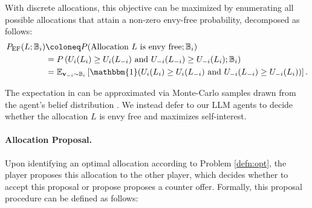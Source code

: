 With discrete allocations, this objective can be maximized by enumerating all possible allocations that attain a non-zero envy-free probability, decomposed as follows:
\begin{align}
\label{eq:envy-free-prob}
P_{\text{EF}}(L; \mathbb{B}_i) &\coloneq P(\text{Allocation } L \text{ is envy free}; \mathbb{B}_i) \nonumber \\
&= P\left( U_i(L_i) \geq U_i(L_{-i}) \text{ and } U_{-i}(L_{-i}) \geq U_{-i}(L_i); \mathbb{B}_i\right) \nonumber \\
&= \mathbb{E}_{\mathbf{v}_{-i} \sim \mathbb{B}_i} \left[ \mathbbm{1}( U_i(L_i) \geq U_i(L_{-i}) \text{ and } U_{-i}(L_{-i}) \geq U_{-i}(L_i)) \right].
\end{align}

The expectation in  can be approximated via Monte-Carlo samples drawn from the agent's belief distribution \citep{liu2024dellma}. We instead defer to our LLM agents to decide whether the allocation $L$ is envy free and maximizes self-interest.




\paragraph{Allocation Proposal.} Upon identifying an optimal allocation according to Problem \ref{defn:opt}, the player proposes this allocation to the other player, which decides whether to accept this proposal or propose proposes a counter offer. Formally, this proposal procedure can be defined as follows:

